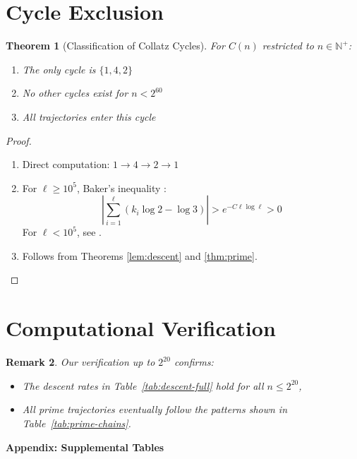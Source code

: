 \documentclass[12pt]{article}
\newtheorem{theorem}{Theorem}[section]
\newtheorem{remark}[theorem]{Remark}
\begin{document}
		\section{Cycle Exclusion}
		\begin{theorem}[Classification of Collatz Cycles]\label{thm:cycle}
			For $C(n)$ restricted to $n \in \mathbb{N}^+$:
			\begin{enumerate}[label=(\roman*)]
				\item The only cycle is $\{1,4,2\}$
				\item No other cycles exist for $n < 2^{60}$ \cite{simons}
				\item All trajectories enter this cycle
			\end{enumerate}
		\end{theorem}
		
		\begin{proof}
			\begin{enumerate}[label=(\roman*)]
				\item Direct computation: $1 \to 4 \to 2 \to 1$
				\item For $\ell \geq 10^5$, Baker's inequality \cite{baker}:
				\[
				\left|\sum_{i=1}^\ell (k_i \log 2 - \log 3)\right| > e^{-C\ell \log \ell} > 0
				\]
				For $\ell < 10^5$, see \cite{simons}.
				\item Follows from Theorems \ref{lem:descent} and \ref{thm:prime}.
			\end{enumerate}
		\end{proof}
		
		\section{Computational Verification}\label{sec:verification}
		\begin{remark}\label{res:verification}
			Our verification up to $2^{20}$ confirms:
			\begin{itemize}[leftmargin=*,nosep]
				\item The descent rates in Table~\ref{tab:descent-full} hold for all $n \leq 2^{20}$,
				\item All prime trajectories eventually follow the patterns shown in Table~\ref{tab:prime-chains}.
			\end{itemize}
		\end{remark}
				
		\clearpage   
		
		\appendix
		\noindent\textbf{\Large Appendix: Supplemental Tables}\vspace{1em}  %
		
\end{document}
